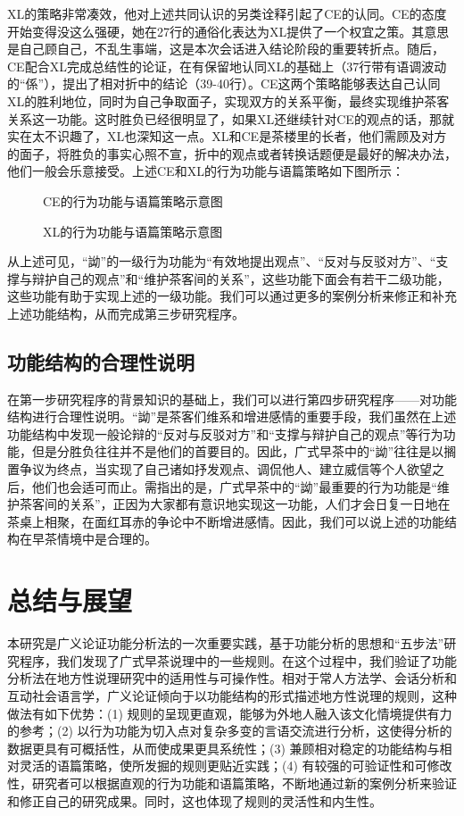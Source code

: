 \documentclass[b5paper,10.5pt,onecolumn,twoside,leqno,UTF8]{article}
\begin{document}
XL的策略非常凑效，他对上述共同认识的另类诠释引起了CE的认同。CE的态度开始变得没这么强硬，她在27行的通俗化表达为XL提供了一个权宜之策。其意思是自己顾自己，不乱生事端，这是本次会话进入结论阶段的重要转折点。随后，CE配合XL完成总结性的论证，在有保留地认同XL的基础上（37行带有语调波动的“係”），提出了相对折中的结论（39-40行）。CE这两个策略能够表达自己认同XL的胜利地位，同时为自己争取面子，实现双方的关系平衡，最终实现维护茶客关系这一功能。这时胜负已经很明显了，如果XL还继续针对CE的观点的话，那就实在太不识趣了，XL也深知这一点。XL和CE是茶楼里的长者，他们需顾及对方的面子，将胜负的事实心照不宣，折中的观点或者转换话题便是最好的解决办法，他们一般会乐意接受。上述CE和XL的行为功能与语篇策略如下图所示：

\begin{figure}[h!]

\caption{CE的行为功能与语篇策略示意图}
\end{figure}

\begin{figure}[h!]


\caption{XL的行为功能与语篇策略示意图}
\end{figure}
从上述可见，“詏”的一级行为功能为“有效地提出观点”、“反对与反驳对方”、“支撑与辩护自己的观点”和“维护茶客间的关系”，这些功能下面会有若干二级功能，这些功能有助于实现上述的一级功能。我们可以通过更多的案例分析来修正和补充上述功能结构，从而完成第三步研究程序。


\subsection{功能结构的合理性说明}

在第一步研究程序的背景知识的基础上，我们可以进行第四步研究程序——对功能结构进行合理性说明。“詏”是茶客们维系和增进感情的重要手段，我们虽然在上述功能结构中发现一般论辩的“反对与反驳对方”和“支撑与辩护自己的观点”等行为功能，但是分胜负往往并不是他们的首要目的。因此，广式早茶中的“詏”往往是以搁置争议为终点，当实现了自己诸如抒发观点、调侃他人、建立威信等个人欲望之后，他们也会适可而止。需指出的是，广式早茶中的“詏”最重要的行为功能是“维护茶客间的关系”，正因为大家都有意识地实现这一功能，人们才会日复一日地在茶桌上相聚，在面红耳赤的争论中不断增进感情。因此，我们可以说上述的功能结构在早茶情境中是合理的。

\section{总结与展望}
本研究是广义论证功能分析法的一次重要实践，基于功能分析的思想和“五步法”研究程序，我们发现了广式早茶说理中的一些规则。在这个过程中，我们验证了功能分析法在地方性说理研究中的适用性与可操作性。相对于常人方法学、会话分析和互动社会语言学，广义论证倾向于以功能结构的形式描述地方性说理的规则，这种做法有如下优势：(1) 规则的呈现更直观，能够为外地人融入该文化情境提供有力的参考；(2) 以行为功能为切入点对复杂多变的言语交流进行分析，这使得分析的数据更具有可概括性，从而使成果更具系统性；(3) 兼顾相对稳定的功能结构与相对灵活的语篇策略，使所发掘的规则更贴近实践；(4) 有较强的可验证性和可修改性，研究者可以根据直观的行为功能和语篇策略，不断地通过新的案例分析来验证和修正自己的研究成果。同时，这也体现了规则的灵活性和内生性。
\end{document}
